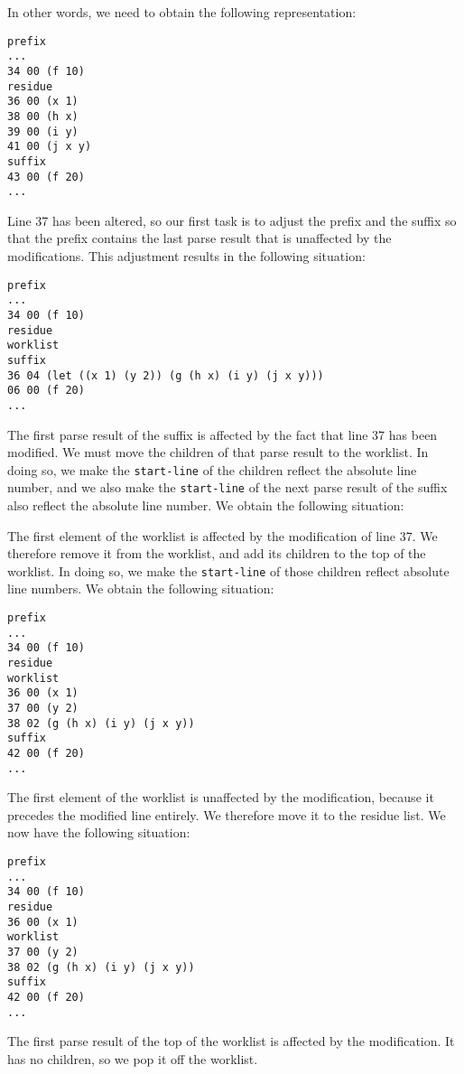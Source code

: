 In other words, we need to obtain the following representation:

{\small\begin{verbatim}
prefix
...
34 00 (f 10)
residue
36 00 (x 1)
38 00 (h x)
39 00 (i y)
41 00 (j x y)
suffix
43 00 (f 20)
...
\end{verbatim}}

Line 37 has been altered, so our first task is to adjust the prefix
and the suffix so that the prefix contains the last parse result that
is unaffected by the modifications.  This adjustment results in the
following situation:

{\small\begin{verbatim}
prefix
...
34 00 (f 10)
residue
worklist
suffix
36 04 (let ((x 1) (y 2)) (g (h x) (i y) (j x y)))
06 00 (f 20)
...
\end{verbatim}}

The first parse result of the suffix is affected by the fact that line
37 has been modified.  We must move the children of that parse result
to the worklist.  In doing so, we make the \texttt{start-line} of the
children reflect the absolute line number, and we also make the
\texttt{start-line} of the next parse result of the suffix also
reflect the absolute line number.  We obtain the following situation:

The first element of the worklist is affected by the modification of
line 37.  We therefore remove it from the worklist, and add its
children to the top of the worklist.  In doing so, we make the
\texttt{start-line} of those children reflect absolute line numbers.
We obtain the following situation:

{\small\begin{verbatim}
prefix
...
34 00 (f 10)
residue
worklist
36 00 (x 1)
37 00 (y 2)
38 02 (g (h x) (i y) (j x y))
suffix
42 00 (f 20)
...
\end{verbatim}}

The first element of the worklist is unaffected by the modification,
because it precedes the modified line entirely.  We therefore move it
to the residue list.  We now have the following situation:

{\small\begin{verbatim}
prefix
...
34 00 (f 10)
residue
36 00 (x 1)
worklist
37 00 (y 2)
38 02 (g (h x) (i y) (j x y))
suffix
42 00 (f 20)
...
\end{verbatim}}

The first parse result of the top of the worklist is affected by the
modification.  It has no children, so we pop it off the worklist.

